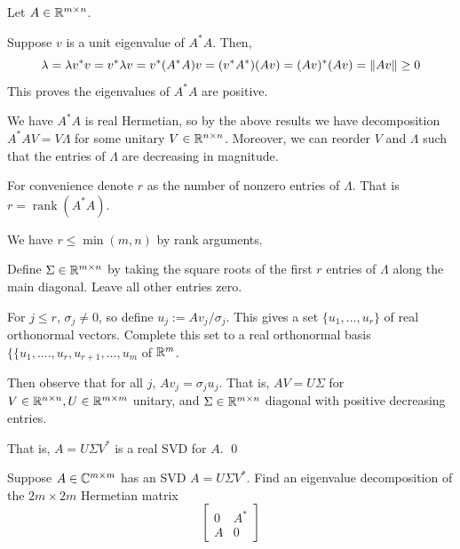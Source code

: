 \documentclass[10pt]{article}
\begin{document}
\begin{solution}[Solution]
Let \( A\in\mathbb{R}^{m\times n} \). 

Suppose \( v \) is a unit eigenvalue of \( A^*A \). Then, \[ \lambda = \lambda v^*v = v^*\lambda v = v^*(A^*A)v=(v^*A^*)(Av) = (Av)^*(Av) = \left\lVert Av\right\rVert \geq 0  \] 
This proves the eigenvalues of \( A^*A \) are positive.

We have \( A^*A \) is real Hermetian, so by the above results we have decomposition \( A^*AV=V\Lambda \) for some unitary \( V\in\mathbb{R}^{n\times n} \). Moreover, we can reorder \( V \) and \( \Lambda \) such that the entries of \( \Lambda \) are decreasing in magnitude.


For convenience denote \( r \) as the number of nonzero entries of \( \Lambda \). That is \( r=\operatorname{rank}(A^*A) \).

We have \( r\leq \operatorname{min}(m,n) \) by rank arguments.

Define \( \Sigma\in\mathbb{R}^{m\times n} \) by taking the square roots of the first \( r \) entries of \( \Lambda \) along the main diagonal. Leave all other entries zero.

For \( j\leq r \), \( \sigma_j\neq0 \), so define \( u_j:= Av_j/\sigma_j \). This gives a set \( \{ u_1, ..., u_r\} \) of real orthonormal vectors. Complete this set to a real orthonormal basis \( \{ \{u_1, ...., u_{r},u_{r+1}, ..., u_{m} \) of \( \mathbb{R}^{m} \).

Then observe that for all \( j \), \( Av_j = \sigma_ju_j \). That is, \( AV=U\Sigma \) for \( V\in\mathbb{R}^{n\times n}, U\in\mathbb{R}^{m\times m} \) unitary, and \( \Sigma\in\mathbb{R}^{m\times n} \) diagonal with positive decreasing entries.

That is, \( A=U\Sigma V^* \) is a real SVD for \( A \). \qed
\end{solution}
\begin{problem}[Exercise 5.4]
    Suppose \( A\in\mathbb{C}^{m\times m} \) has an SVD \( A=U\Sigma V^* \). Find an eigenvalue decomposition of the \( 2m\times 2m \) Hermetian matrix
    \[ \left[\begin{array}{cc}0 & A^* \\ A & 0\end{array}\right] \]
\end{problem}
\end{document}
